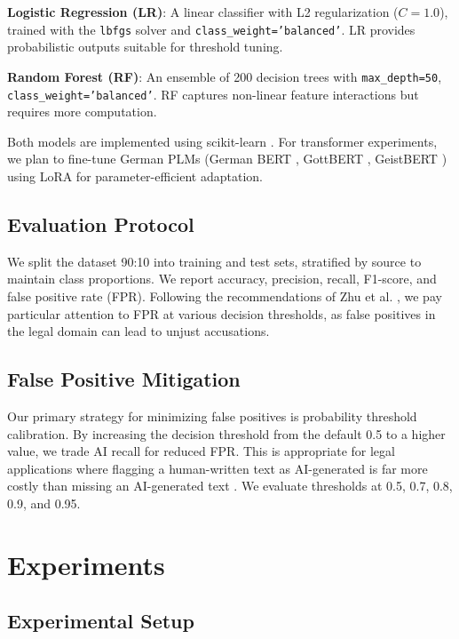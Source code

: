 \documentclass[11pt,a4paper]{article}
\begin{document}
\textbf{Logistic Regression (LR)}: A linear classifier with L2 regularization ($C=1.0$), trained with the {\tt lbfgs} solver and {\tt class\_weight='balanced'}. LR provides probabilistic outputs suitable for threshold tuning.

\textbf{Random Forest (RF)}: An ensemble of 200 decision trees with {\tt max\_depth=50}, {\tt class\_weight='balanced'}. RF captures non-linear feature interactions but requires more computation.

Both models are implemented using scikit-learn \cite{pedregosa2011scikit}. For transformer experiments, we plan to fine-tune German PLMs (German BERT \cite{chan2020german}, GottBERT \cite{scheible2024gottbert}, GeistBERT \cite{scheible2025geistbert}) using LoRA \cite{hu2022lora} for parameter-efficient adaptation.

\subsection{Evaluation Protocol}

We split the dataset 90:10 into training and test sets, stratified by source to maintain class proportions. We report accuracy, precision, recall, F1-score, and false positive rate (FPR). Following the recommendations of Zhu et al. \cite{zhu2025reliably}, we pay particular attention to FPR at various decision thresholds, as false positives in the legal domain can lead to unjust accusations.

\subsection{False Positive Mitigation}

Our primary strategy for minimizing false positives is probability threshold calibration. By increasing the decision threshold from the default 0.5 to a higher value, we trade AI recall for reduced FPR. This is appropriate for legal applications where flagging a human-written text as AI-generated is far more costly than missing an AI-generated text \cite{weber2023testing}. We evaluate thresholds at 0.5, 0.7, 0.8, 0.9, and 0.95.

\section{Experiments}

\subsection{Experimental Setup}
\end{document}
